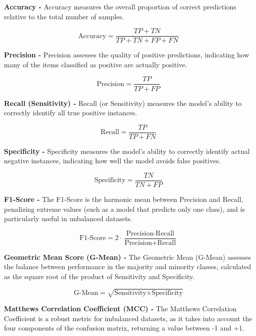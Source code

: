 \textbf{Accuracy - } Accuracy measures the overall proportion of correct predictions relative to the total number of samples.

\begin{equation}
\text{Accuracy} = \frac{TP + TN}{TP + TN + FP + FN}
\end{equation}

\textbf{Precision - } Precision assesses the quality of positive predictions, indicating how many of the items classified as positive are actually positive.

\begin{equation}
\text{Precision} = \frac{TP}{TP + FP}
\end{equation}

\textbf{Recall (Sensitivity) - } Recall (or Sensitivity) measures the model's ability to correctly identify all true positive instances.

\begin{equation}
\text{Recall} = \frac{TP}{TP + FN}
\end{equation}

\textbf{Specificity - } Specificity measures the model's ability to correctly identify actual negative instances, indicating how well the model avoids false positives.

\begin{equation}
\text{Specificity} = \frac{TN}{TN + FP}
\end{equation}

\textbf{F1-Score - } The F1-Score is the harmonic mean between Precision and Recall, penalizing extreme values (such as a model that predicts only one class), and is particularly useful in unbalanced datasets.

\begin{equation}
\text{F1-Score} = 2 \cdot \frac{\text{Precision} \cdot \text{Recall}}{\text{Precision} + \text{Recall}}
\end{equation}

\textbf{Geometric Mean Score (G-Mean) - } The Geometric Mean (G-Mean) assesses the balance between performance in the majority and minority classes, calculated as the square root of the product of Sensitivity and Specificity.

\begin{equation}
\text{G-Mean} = \sqrt{\text{Sensitivity} \times \text{Specificity}}
\end{equation}

\textbf{Matthews Correlation Coefficient (MCC) - } The Matthews Correlation Coefficient is a robust metric for imbalanced datasets, as it takes into account the four components of the confusion matrix, returning a value between -1 and +1.

